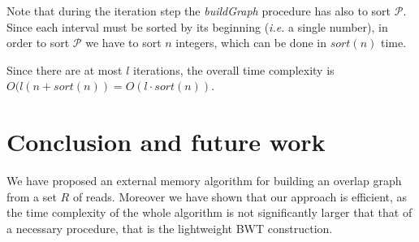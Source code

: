 \documentclass[runningheads,envcountsame,a4paper]{llncs}
\newcommand{\ie}{\textit{i.e.}\xspace}
\begin{document}
Note that during the iteration step the \emph{buildGraph} procedure has also to
sort $\mathcal{P}$. Since each interval must be sorted by its beginning (\ie a
single number), in order to sort  $\mathcal{P}$ we have to sort $n$ integers,
which can be done in $sort(n)$ time.

Since there are at most $l$ iterations, the overall time complexity is
$O(l (n + sort(n))=O(l \cdot sort(n))$.



\section{Conclusion and future work}
%

We have  proposed an external memory algorithm for building an overlap  graph from a set $R$ of reads.
Moreover we have shown that our approach is efficient, as the time complexity of
the whole algorithm is not significantly larger that that of a necessary
procedure, that is the lightweight BWT construction.
\end{document}
